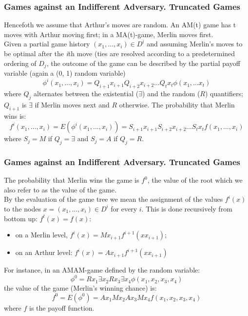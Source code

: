 \documentclass{beamer}
\begin{document}
\begin{frame}
\frametitle{Games against an Indifferent Adversary. Truncated Games}
Hencefoth we assume that Arthur's moves are random. An AM(t) game has t moves with Arthur moving first; in a MA(t)-game, Merlin moves first.\\
Given a partial game history $(x_1, \ldots, x_i) \in D^i$ and assuming Merlin's moves to be optimal after the \textit{i}th move (ties are resolved according to a predetermined ordering of $D_j$, the outcome of the game can be described by the partial payoff variable (again a (0, 1) random variable)
$$ \phi^i(x_1,\ldots,x_i) = Q_{i+1}x_{i+1}Q_{i+2}x_{i+2}\ldots Q_{t}x_{t} \phi(x_1,\ldots x_t)$$where $Q_j$ alternates between the existential ($\exists$) and the random ($R$) quantifiers; $Q_{i+1}$ is  $\exists$ if Merlin moves next and $R$ otherwise.
The probability that Merlin wins is: $$f^i (x_1,\ldots,x_i) = E(\phi^i (x_1,\ldots,x_i)) = S_{i+1}x_{i+1}S_{i+2}x_{i+2}\ldots S_t x_t f (x_1,\ldots,x_i)$$
where $S_j = M$ if $Q_j = \exists$ and $S_j = A$ if $Q_j = R$.
\end{frame}

\begin{frame}
\frametitle{Games against an Indifferent Adversary. Truncated Games}
The probability that Merlin wins the game is $f^0$, the value of the root which we also refer to as the value of the game.\\
By the evaluation of the game tree we mean the assignment of the values $f^i (x)$ to the nodes $x = (x_1,\ldots, x_i) \in D^i$ for every $i$. This is done recursively from bottom up: $f^t (x) = f(x)$:
\begin{itemize}
\item on a Merlin level, $f^i (x) = Mx_{i+1}f^{i+1}(xx_{i+1})$;
\item on an Arthur level: $f^i (x) = Ax_{i+1}f^{i+1}(xx_{i+1})$
\end{itemize}
For instance, in an AMAM-game defined by the random variable:
$$\phi^0 = Rx_1 \exists x_2 R x_3 \exists x_4 \phi(x_1, x_2, x_3, x_4)$$
the value of the game (Merlin's winning chance) is:
$$f^0 = E(\phi^0) = Ax_1 Mx_2 Ax_3 Mx_4 f(x_1, x_2, x_3, x_4)$$
where $f$ is the payoff function.
\end{frame}
\end{document}
